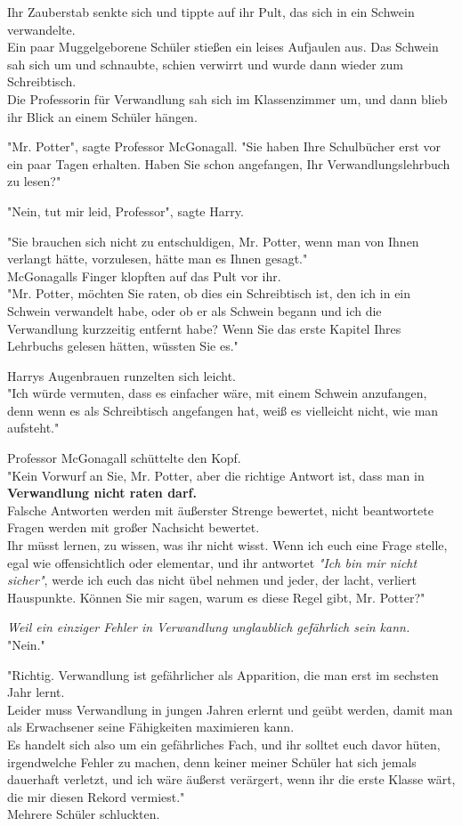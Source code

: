 {Ihr Zauberstab senkte sich und tippte auf ihr Pult, das sich in ein Schwein verwandelte.\\ Ein paar Muggelgeborene Schüler stießen ein leises Aufjaulen aus. Das Schwein sah sich um und schnaubte, schien verwirrt und wurde dann wieder zum Schreibtisch.\\ Die Professorin für Verwandlung sah sich im Klassenzimmer um, und dann blieb ihr Blick an einem Schüler hängen.

"Mr. Potter", sagte Professor McGonagall. "Sie haben Ihre Schulbücher erst vor ein paar Tagen erhalten. Haben Sie schon angefangen, Ihr Verwandlungslehrbuch zu lesen?"

"Nein, tut mir leid, Professor", sagte Harry.

"Sie brauchen sich nicht zu entschuldigen, Mr. Potter, wenn man von Ihnen verlangt hätte, vorzulesen, hätte man es Ihnen gesagt."\\ McGonagalls Finger klopften auf das Pult vor ihr.\\ "Mr. Potter, möchten Sie raten, ob dies ein Schreibtisch ist, den ich in ein Schwein verwandelt habe, oder ob er als Schwein begann und ich die Verwandlung kurzzeitig entfernt habe? Wenn Sie das erste Kapitel Ihres Lehrbuchs gelesen hätten, wüssten Sie es."

Harrys Augenbrauen runzelten sich leicht.\\ "Ich würde vermuten, dass es einfacher wäre, mit einem Schwein anzufangen, denn wenn es als Schreibtisch angefangen hat, weiß es vielleicht nicht, wie man aufsteht."

Professor McGonagall schüttelte den Kopf.\\ "Kein Vorwurf an Sie, Mr. Potter, aber die richtige Antwort ist, dass man in \textbf{Verwandlung nicht raten darf.}\\ Falsche Antworten werden mit äußerster Strenge bewertet, nicht beantwortete Fragen werden mit großer Nachsicht bewertet.\\ Ihr müsst lernen, zu wissen, was ihr nicht wisst. Wenn ich euch eine Frage stelle, egal wie offensichtlich oder elementar, und ihr antwortet \emph{"Ich bin mir nicht sicher"}, werde ich euch das nicht übel nehmen und jeder, der lacht, verliert Hauspunkte. Können Sie mir sagen, warum es diese Regel gibt, Mr. Potter?"

\emph{Weil ein einziger Fehler in Verwandlung unglaublich gefährlich sein kann.}\\ "Nein."

"Richtig. Verwandlung ist gefährlicher als Apparition, die man erst im sechsten Jahr lernt.\\ Leider muss Verwandlung in jungen Jahren erlernt und geübt werden, damit man als Erwachsener seine Fähigkeiten maximieren kann.\\ Es handelt sich also um ein gefährliches Fach, und ihr solltet euch davor hüten, irgendwelche Fehler zu machen, denn keiner meiner Schüler hat sich jemals dauerhaft verletzt, und ich wäre äußerst verärgert, wenn ihr die erste Klasse wärt, die mir diesen Rekord vermiest."\\ Mehrere Schüler schluckten.

}
